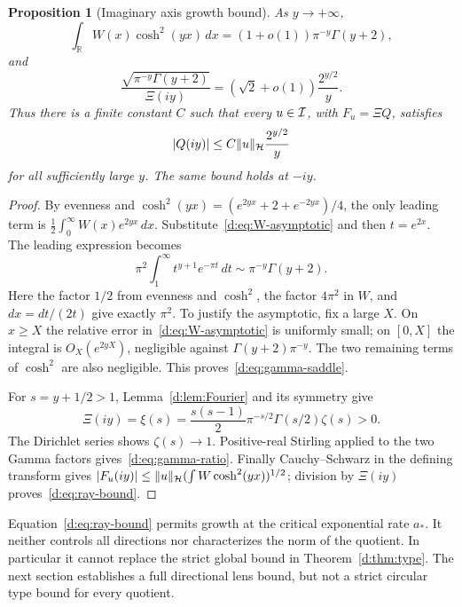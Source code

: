 \documentclass[11pt,a4paper]{article}
\numberwithin{equation}{section}
\newtheorem{proposition}[theorem]{Proposition}
\theoremstyle{definition}\newtheorem{definition}[theorem]{Definition}
\theoremstyle{remark}\newtheorem{remark}[theorem]{Remark}
\newcommand{\R}{\mathbb R}\newcommand{\C}{\mathbb C}\newcommand{\N}{\mathbb N}
\newcommand{\Hh}{\mathcal H}\newcommand{\Hw}{\mathcal H}
\begin{document}
\begin{proposition}[Imaginary axis growth bound]\label{d:prop:ray}
As $y\to+\infty$,
\begin{equation}\label{d:eq:gamma-saddle}
 \int_\R W(x)\cosh^2(yx)\,dx
 =(1+o(1))\pi^{-y}\Gamma(y+2),
\end{equation}
and
\begin{equation}\label{d:eq:gamma-ratio}
 \frac{\sqrt{\pi^{-y}\Gamma(y+2)}}{\Xi(iy)}
 =(\sqrt2+o(1))\frac{2^{y/2}}{y}.
\end{equation}
Thus there is a finite constant $C$ such that every $u\in\mathcal I$, with $F_u=\Xi Q$, satisfies
\begin{equation}\label{d:eq:ray-bound}
 |Q(iy)|\le C\norm{u}_{\Hh}\frac{2^{y/2}}{y}
\end{equation}
for all sufficiently large $y$. The same bound holds at $-iy$.
\end{proposition}
\begin{proof}
By evenness and $\cosh^2(yx)=(e^{2yx}+2+e^{-2yx})/4$, the only leading term is
$\frac12\int_0^\infty W(x)e^{2yx}\,dx$. Substitute~\eqref{d:eq:W-asymptotic} and then $t=e^{2x}$. The leading expression becomes
\[
 \pi^2\int_1^\infty t^{y+1}e^{-\pi t}\,dt
 \sim\pi^{-y}\Gamma(y+2).
\]
Here the factor $1/2$ from evenness and $\cosh^2$, the factor $4\pi^2$ in $W$, and $dx=dt/(2t)$ give exactly $\pi^2$. To justify the asymptotic, fix a large $X$. On $x\ge X$ the relative error in~\eqref{d:eq:W-asymptotic} is uniformly small; on $[0,X]$ the integral is $O_X(e^{2yX})$, negligible against $\Gamma(y+2)\pi^{-y}$. The two remaining terms of $\cosh^2$ are also negligible. This proves~\eqref{d:eq:gamma-saddle}.

For $s=y+1/2>1$, Lemma~\ref{d:lem:Fourier} and its symmetry give
\[
 \Xi(iy)=\xi(s)=\frac{s(s-1)}2\pi^{-s/2}\Gamma(s/2)\zeta(s)>0.
\]
The Dirichlet series shows $\zeta(s)\to1$. Positive-real Stirling applied to the two Gamma factors gives~\eqref{d:eq:gamma-ratio}. Finally Cauchy--Schwarz in the defining transform gives
$|F_u(iy)|\le\norm{u}_{\Hh}(\int W\cosh^2(yx))^{1/2}$; division by $\Xi(iy)$ proves~\eqref{d:eq:ray-bound}.
\end{proof}

Equation~\eqref{d:eq:ray-bound} permits growth at the critical exponential rate $a_*$. It neither controls all directions nor characterizes the norm of the quotient. In particular it cannot replace the strict global bound in Theorem~\ref{d:thm:type}. The next section establishes a full directional lens bound, but not a strict circular type bound for every quotient.
\end{document}
